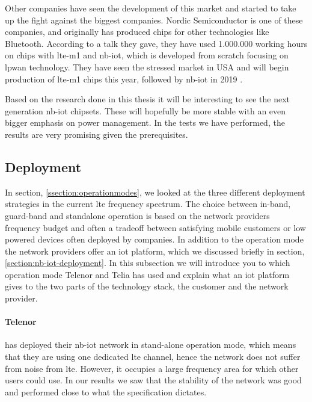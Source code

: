 \documentclass[USenglish]{ifimaster}  %
\begin{document}
Other companies have seen the development of this market and started to take up the fight against the biggest companies. Nordic Semiconductor is one of these companies, and originally has produced chips for other technologies like Bluetooth. According to a talk they gave, they have used 1.000.000 working hours on chips with \acrshort{lte-m1} and \acrshort{nb-iot}, which is developed from scratch focusing on \acrshort{lpwan} technology. They have seen the stressed market in USA and will begin production of \acrshort{lte-m1} chips this year, followed by \acrshort{nb-iot} in 2019 \cite{person:ola}.

Based on the research done in this thesis it will be interesting to see the next generation \acrshort{nb-iot} chipsets. These will hopefully be more stable with an even bigger emphasis on power management. In the tests we have performed, the results are very promising given the prerequisites.

\subsection{Deployment}
In section, \vref{ssection:operationmodes}, we looked at the three different deployment strategies in the current \acrshort{lte} frequency spectrum. The choice between in-band, guard-band and standalone operation is based on the network providers frequency budget and often a tradeoff between satisfying mobile customers or low powered devices often deployed by companies. In addition to the operation mode the network providers offer an \acrshort{iot} platform, which we discussed briefly in section, \vref{section:nb-iot-deployment}. In this subsection we will introduce you to which operation mode Telenor and Telia has used and explain what an \acrshort{iot} platform gives to the two parts of the technology stack, the customer and the network provider.

\paragraph{Telenor} has deployed their \acrshort{nb-iot} network in stand-alone operation mode, which means that they are using one dedicated \acrshort{lte} channel\cite{person:ola}, hence the network does not suffer from noise from \acrshort{lte}. However, it occupies a large frequency area for which other users could use. In our results we saw that the stability of the network was good and performed close to what the specification dictates.
\end{document}
